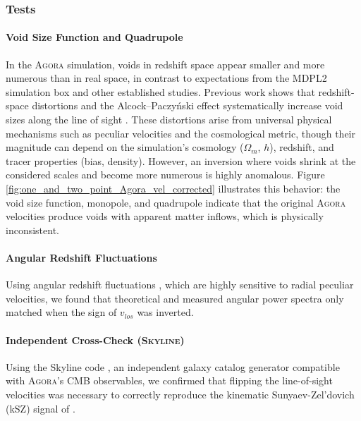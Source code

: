\documentclass[]{aa} %
\begin{document}
\subsubsection{Tests}

\paragraph{Void Size Function and Quadrupole} In the \textsc{Agora} simulation, voids in redshift space appear smaller and more numerous than in real space, in contrast to expectations from the MDPL2 simulation box and other established studies. Previous work shows that redshift-space distortions and the Alcock–Paczyński effect systematically increase void sizes along the line of sight \citep{ryden1996_vsf,lavaux&wandelt2012_stacking_vgcf_aprsd,hamaus2015_vgcf_aprsd, nadathur2019zeldovich,correa2021redshift,correa2022redshift}. These distortions arise from universal physical mechanisms such as peculiar velocities and the cosmological metric, though their magnitude can depend on the simulation’s cosmology ($\Omega_m$, $h$), redshift, and tracer properties (bias, density). However, an inversion where voids shrink at the considered scales and become more numerous is highly anomalous. Figure \ref{fig:one_and_two_point_Agora_vel_corrected} illustrates this behavior: the void size function, monopole, and quadrupole indicate that the original \textsc{Agora} velocities produce voids with apparent matter inflows, which is physically inconsistent.

\paragraph{Angular Redshift Fluctuations} Using angular redshift fluctuations \citet{carlos2019arf}, which are highly sensitive to radial peculiar velocities, we found that theoretical and measured angular power spectra only matched when the sign of $v_{los}$ was inverted.

\paragraph{Independent Cross-Check (\textsc{Skyline})} Using the Skyline code \citet{JB2023}, an independent galaxy catalog generator compatible with \textsc{Agora}'s CMB observables, we confirmed that flipping the line-of-sight velocities was necessary to correctly reproduce the kinematic Sunyaev-Zel’dovich (kSZ) signal of \cite{omori2022}.
\end{document}
